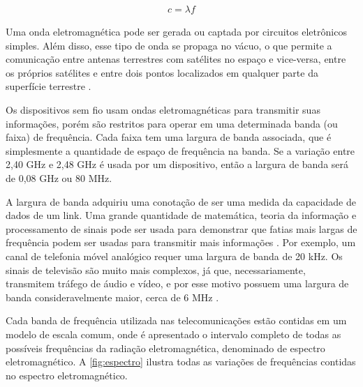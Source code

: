 \begin{equation}
	\begin{aligned}
		c = \lambda f
	\end{aligned}
\end{equation}
\begin{figure}[H]
	\centering
\end{figure}

Uma onda eletromagnética pode ser gerada ou captada por circuitos eletrônicos simples. Além disso, esse tipo de onda se propaga no vácuo, o que permite a comunicação entre antenas terrestres com satélites no espaço e vice-versa, entre os próprios satélites e entre dois pontos localizados em qualquer parte da superfície terrestre \cite{fluminense2010}.

Os dispositivos sem fio usam ondas eletromagnéticas para transmitir suas informações, porém são restritos para operar em uma determinada banda (ou faixa) de frequência. Cada faixa tem uma largura de banda associada, que é simplesmente a quantidade de espaço de frequência na banda. Se a variação entre 2,40 GHz e 2,48 GHz é usada por um dispositivo, então a largura de banda será de 0,08 GHz ou 80 MHz.

A largura de banda adquiriu uma conotação de ser uma medida da capacidade de dados de um link. Uma grande quantidade de matemática, teoria da informação e processamento de sinais pode ser usada para demonstrar que fatias mais largas de frequência podem ser usadas para transmitir mais informações \cite{gast2002}. Por exemplo, um canal de telefonia móvel analógico requer uma largura de banda de 20 kHz. Os sinais de televisão são muito mais complexos, já que, necessariamente, transmitem tráfego de áudio e vídeo, e por esse motivo possuem uma largura de banda consideravelmente maior, cerca de 6 MHz \cite{gast2002}.

Cada banda de frequência utilizada nas telecomunicações estão contidas em um modelo de escala comum, onde é apresentado o intervalo completo de todas as possíveis frequências da radiação eletromagnética, denominado de espectro eletromagnético. A \autoref{fig:espectro} ilustra todas as variações de frequências contidas no espectro eletromagnético.

